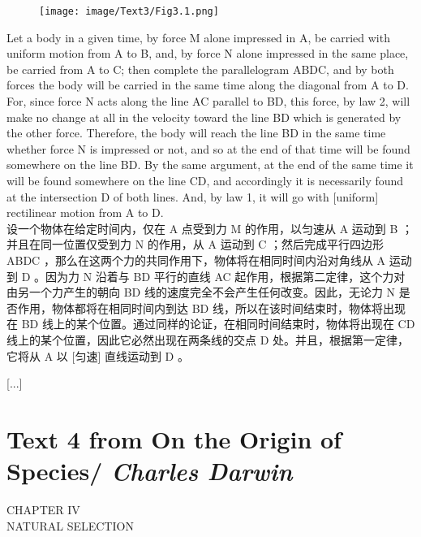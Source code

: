 \documentclass{article}
\begin{document}
\addtolength{\leftskip}{-1cm}
\addtolength{\rightskip}{-1cm}
\begin{figure}
    \centering
    \texttt{[image: image/Text3/Fig3.1.png]}
\end{figure}
\noindent Let a body in a given time, by force M alone impressed in A, be carried with uniform motion from A to B, and, by force N alone impressed in the same place, be carried from A to C; then complete the parallelogram ABDC, and by both forces the body will be carried in the same time along the diagonal from A to D. For, since force N acts along the line AC parallel to BD, this force, by law 2, will make no change at all in the velocity toward the line BD which is generated by the other force. Therefore, the body will reach the line BD in the same time whether force N is impressed or not, and so at the end of that time will be found somewhere on the line BD. By the same argument, at the end of the same time it will be found somewhere on the line CD, and accordingly it is necessarily found at the intersection D of both lines. And, by law 1, it will go with [uniform] rectilinear motion from A to D.\\
设一个物体在给定时间内，仅在 A 点受到力 M 的作用，以匀速从 A 运动到 B ；并且在同一位置仅受到力 N 的作用，从 A 运动到 C ；然后完成平行四边形 ABDC ，那么在这两个力的共同作用下，物体将在相同时间内沿对角线从 A 运动到 D 。因为力 N 沿着与 BD 平行的直线 AC 起作用，根据第二定律，这个力对由另一个力产生的朝向 BD 线的速度完全不会产生任何改变。因此，无论力 N 是否作用，物体都将在相同时间内到达 BD 线，所以在该时间结束时，物体将出现在 BD 线上的某个位置。通过同样的论证，在相同时间结束时，物体将出现在 CD 线上的某个位置，因此它必然出现在两条线的交点 D 处。并且，根据第一定律，它将从 A 以 [匀速] 直线运动到 D 。\\

\begin{center}
    [...]
\end{center}

\newpage
\section{Text 4 from On the Origin of Species/ \textit{Charles Darwin}}
\begin{center}
    CHAPTER IV\\
    NATURAL SELECTION
\end{center}

\addtolength{\leftskip}{1cm}
\addtolength{\rightskip}{1cm}
\end{document}
